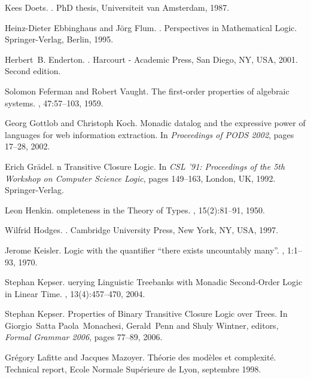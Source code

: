 \documentclass{LMCS}
\begin{document}
\begin{thebibliography}{10}
Kees Doets.
.
\newblock PhD thesis, Universiteit van Amsterdam, 1987.

Heinz-Dieter Ebbinghaus and J\"{o}rg Flum.
.
\newblock Perspectives in Mathematical Logic. Springer-Verlag, Berlin, 1995.

Herbert~B. Enderton.
.
\newblock Harcourt - Academic Press, San Diego, NY, USA, 2001.
\newblock Second edition.

Solomon Feferman and Robert Vaught.
\newblock The first-order properties of algebraic systems.
, 47:57--103, 1959.

Georg Gottlob and Christoph Koch.
\newblock Monadic datalog and the expressive power of languages for web
  information extraction.
\newblock In {\em Proceedings of {PODS} 2002}, pages 17--28, 2002.

Erich Gr\"{a}del.
n {T}ransitive {C}losure {L}ogic.
\newblock In {\em CSL '91: Proceedings of the 5th Workshop on Computer Science
  Logic}, pages 149--163, London, UK, 1992. Springer-Verlag.

Leon Henkin.
ompleteness in the {T}heory of {T}ypes.
, 15(2):81--91, 1950.

Wilfrid Hodges.
.
\newblock Cambridge University Press, New York, NY, USA, 1997.

Jerome Keisler.
\newblock Logic with the quantifier ``there exists uncountably many''.
, 1:1--93, 1970.

Stephan Kepser.
uerying {L}inguistic {T}reebanks with {M}onadic {S}econd-{O}rder
  {L}ogic in {L}inear {T}ime.
, 13(4):457--470, 2004.

Stephan Kepser.
\newblock Properties of {B}inary {T}ransitive {C}losure {L}ogic over {T}rees.
\newblock In Giorgio~Satta Paola~Monachesi, Gerald~Penn and Shuly Wintner,
  editors, {\em Formal Grammar 2006}, pages 77--89, 2006.

Gr\'{e}gory Lafitte and Jacques Mazoyer.
\newblock Th\'{e}orie des mod\`{e}les et complexit\'{e}.
\newblock Technical report, Ecole Normale Sup\'{e}rieure de Lyon, septembre
  1998.


\end{thebibliography}
\end{document}
